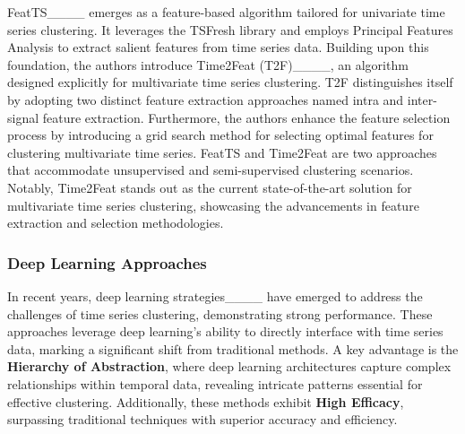 FeatTS____ emerges as a feature-based algorithm tailored for univariate time series clustering. It leverages the TSFresh library and employs Principal Features Analysis to extract salient features from time series data. 
Building upon this foundation, the authors introduce Time2Feat (T2F)____, an algorithm designed explicitly for multivariate time series clustering. T2F distinguishes itself by adopting two distinct feature extraction approaches named intra and inter-signal feature extraction. 
Furthermore, the authors enhance the feature selection process by introducing a grid search method for selecting optimal features for clustering multivariate time series.
FeatTS and Time2Feat are two approaches that accommodate unsupervised and semi-supervised clustering scenarios. Notably, Time2Feat stands out as the current state-of-the-art solution for multivariate time series clustering, showcasing the advancements in feature extraction and selection methodologies.



\subsubsection{Deep Learning Approaches}

In recent years, deep learning strategies____ have emerged to address the challenges of time series clustering, demonstrating strong performance. These approaches leverage deep learning's ability to directly interface with time series data, marking a significant shift from traditional methods. A key advantage is the \textbf{Hierarchy of Abstraction}, where deep learning architectures capture complex relationships within temporal data, revealing intricate patterns essential for effective clustering. Additionally, these methods exhibit \textbf{High Efficacy}, surpassing traditional techniques with superior accuracy and efficiency.

